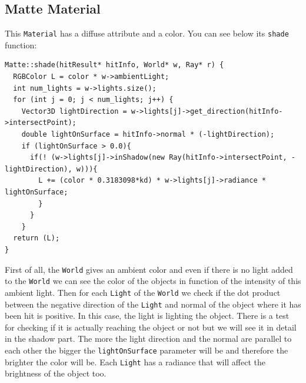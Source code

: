 \documentclass[a4paper,11.5pt]{article}
\theoremstyle{mytheor}
\begin{document}
\subsection{Matte Material}
This \texttt{Material} has a diffuse attribute and a color. You can see below its \texttt{shade} function: 
\begin{lstlisting}
Matte::shade(hitResult* hitInfo, World* w, Ray* r) {
  RGBColor L = color * w->ambientLight;
  int num_lights = w->lights.size();
  for (int j = 0; j < num_lights; j++) {
    Vector3D lightDirection = w->lights[j]->get_direction(hitInfo->intersectPoint);
    double lightOnSurface = hitInfo->normal * (-lightDirection);
    if (lightOnSurface > 0.0){
      if(! (w->lights[j]->inShadow(new Ray(hitInfo->intersectPoint, -lightDirection), w))){
        L += (color * 0.3183098*kd) * w->lights[j]->radiance * lightOnSurface;
        }
      }
    }
  return (L);
}
\end{lstlisting}
First of all, the \texttt{World} gives an ambient color and even if there is no light added to the \texttt{World} we can see the color of the objects in function of the intensity of this ambient light. Then for each \texttt{Light} of the \texttt{World} we check if the dot product between the negative direction of the \texttt{Light} and normal of the object where it has been hit is positive. In this case, the light is lighting the object. There is a test for checking if it is actually reaching the object or not but we will see it in detail in the shadow part. The more the light direction and the normal are parallel to each other the bigger the \texttt{lightOnSurface} parameter will be and therefore the brighter the color will be. Each \texttt{Light} has a radiance that will affect the brightness of the object too.
\end{document}

